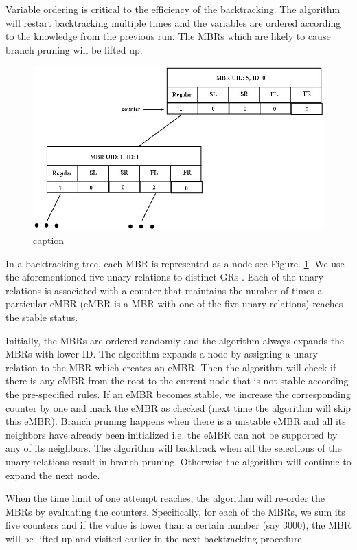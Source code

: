 \documentclass{article}
\begin{document}
Variable ordering is critical to the efficiency of the backtracking. The algorithm will restart backtracking multiple times and the variables are ordered according to the knowledge from the previous run. The MBRs which are likely to cause branch pruning will be lifted up. 

\begin{figure}[h!]
\centering\includegraphics[scale=0.35]{f1.jpg}\caption{caption}
\label{node}
\end{figure}
In a backtracking tree, each MBR is represented as a node see Figure. \ref{node}. We use the aforementioned five unary relations to distinct GRs . Each of the unary relations is associated with a counter that maintains the number of times a particular eMBR (eMBR is a MBR with one of the five unary relations) reaches the stable status. 

Initially, the MBRs are ordered randomly and the algorithm always expands the MBRs with lower ID. The algorithm expands a node by assigning a unary relation to the MBR which creates an eMBR. Then the algorithm will check if there is any eMBR from the root to the current node that is not stable according the pre-specified rules. If an eMBR becomes stable, we increase the corresponding counter by one and mark the eMBR as checked (next time the algorithm will skip this eMBR).  Branch pruning happens when there is a unstable eMBR \underline{and} all its neighbors have already been initialized i.e. the eMBR can not be supported by any of its neighbors. The algorithm will backtrack when all the selections of the unary relations result in branch pruning. 
Otherwise the algorithm will continue to expand the next node.


When the time limit of one attempt reaches, the algorithm will re-order the MBRs by evaluating the counters. Specifically, for each of the MBRs, we sum its five counters and if the value is lower than a certain number (say 3000), the MBR will be lifted up and visited earlier in the next backtracking procedure.  
\end{document}
